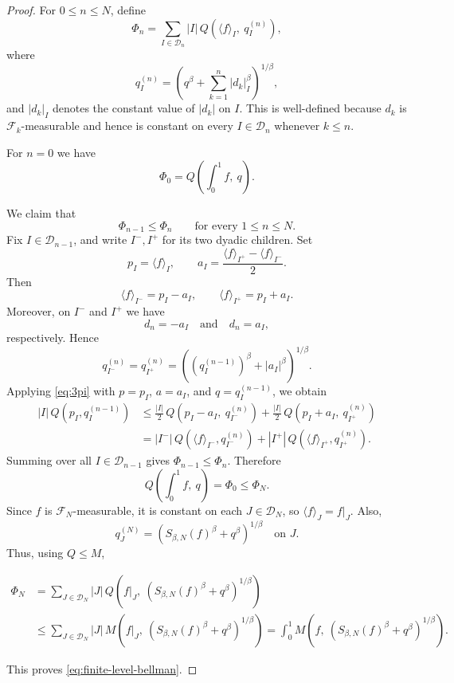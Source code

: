 \documentclass[11pt]{amsart}
\theoremstyle{definition}
\renewcommand{\1}{{\mathbbm{1}}}
\begin{document}
\begin{proof}
For $0\le n\le N$, define
\[
\Phi_n
=
\sum_{I\in\mathcal D_n}
|I|\,Q\!\left(\langle f\rangle_I,\ q_I^{(n)}\right),
\]
where
\[
q_I^{(n)}
=
\left(
q^\beta+\sum_{k=1}^n |d_k|_I^\beta
\right)^{1/\beta},
\]
and $|d_k|_I$ denotes the constant value of $|d_k|$ on $I$. This is
well-defined because $d_k$ is $\mathcal F_k$-measurable and hence is
constant on every $I\in\mathcal D_n$ whenever $k\le n$.

For $n=0$ we have
\[
\Phi_0=Q\!\left(\int_0^1 f,\ q\right).
\]

We claim that
\[
\Phi_{n-1}\le \Phi_n
\qquad \text{for every } 1\le n\le N.
\]
Fix $I\in\mathcal D_{n-1}$, and write $I^-,I^+$ for its two dyadic
children. Set
\[
p_I=\langle f\rangle_I,
\qquad
a_I=\frac{\langle f\rangle_{I^+}-\langle f\rangle_{I^-}}{2}.
\]
Then
\[
\langle f\rangle_{I^-}=p_I-a_I,
\qquad
\langle f\rangle_{I^+}=p_I+a_I.
\]
Moreover, on $I^-$ and $I^+$ we have
\[
d_n=-a_I \quad \text{and} \quad d_n=a_I,
\]
respectively. Hence
\[
q_{I^-}^{(n)}=q_{I^+}^{(n)}
=
\left((q_I^{(n-1)})^\beta+|a_I|^\beta\right)^{1/\beta}.
\]
Applying \eqref{eq:3pi} with $p=p_I$, $a=a_I$, and $q=q_I^{(n-1)}$, we obtain
\begin{align*}
|I|\,Q(p_I,q_I^{(n-1)})
&\le
\frac{|I|}{2}\,
Q\!\left(p_I-a_I,\ q_{I^-}^{(n)}\right)
+
\frac{|I|}{2}\,
Q\!\left(p_I+a_I,\ q_{I^+}^{(n)}\right) \\
&=
|I^-|\,Q\!\left(\langle f\rangle_{I^-}, q_{I^-}^{(n)}\right)
+
|I^+|\,Q\!\left(\langle f\rangle_{I^+}, q_{I^+}^{(n)}\right).
\end{align*}
Summing over all $I\in\mathcal D_{n-1}$ gives $\Phi_{n-1}\le \Phi_n$.
Therefore
\[
Q\!\left(\int_0^1 f,\ q\right)=\Phi_0\le \Phi_N.
\]
Since $f$ is $\mathcal F_N$-measurable, it is constant on each
$J\in\mathcal D_N$, so $\langle f\rangle_J=f|_J$. Also,
\[
q_J^{(N)}
=
\left(S_{\beta,N}(f)^\beta+q^\beta\right)^{1/\beta}
\quad \text{on } J.
\]
Thus, using $Q\le M$,
\begin{small}
    \begin{align*}
\Phi_N
&=
\sum_{J\in\mathcal D_N}
|J|\,
Q\!\left(f|_J,\ (S_{\beta,N}(f)^\beta+q^\beta)^{1/\beta}\right) \\
&\le
\sum_{J\in\mathcal D_N}
|J|\,
M\!\left(f|_J,\ (S_{\beta,N}(f)^\beta+q^\beta)^{1/\beta}\right) =
\int_0^1
M\!\left(f,\ (S_{\beta,N}(f)^\beta+q^\beta)^{1/\beta}\right).
\end{align*}
\end{small}
This proves \eqref{eq:finite-level-bellman}.
\end{proof}
\end{document}
